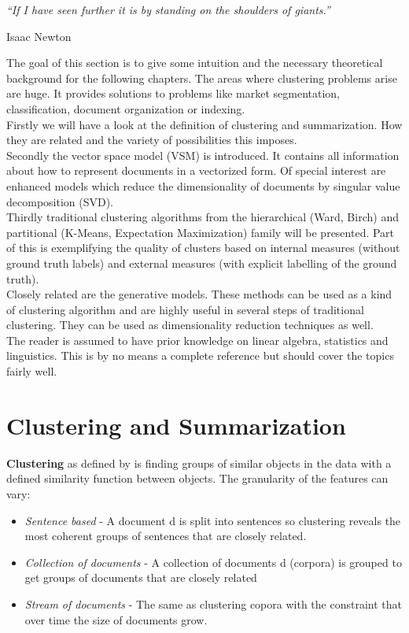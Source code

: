 \epigraph{\emph{
  ``If I have seen further it is by standing on the shoulders of giants.''
}}{ Isaac Newton }

The goal of this section is to give some intuition and the necessary theoretical background for the following chapters. The areas where clustering problems arise are huge. It provides solutions to problems like market segmentation, classification, document organization or indexing.\\
Firstly we will have a look at the definition of clustering and summarization. How they are related and the variety of possibilities this imposes.\\
Secondly the vector space model (VSM) is introduced. It contains all information about how to represent documents in a vectorized form. Of special interest are enhanced models which reduce the dimensionality of documents by singular value decomposition (SVD).\\
Thirdly traditional clustering algorithms from the hierarchical (Ward, Birch) and partitional (K-Means, Expectation Maximization) family will be presented. Part of this is exemplifying the quality of clusters based on internal measures (without ground truth labels) and external measures (with explicit labelling of the ground truth).\\
Closely related are the generative models. These methods can be used as a kind of clustering algorithm and are highly useful in several steps of traditional clustering. They can be used as dimensionality reduction techniques as well.\\
The reader is assumed to have prior knowledge on linear algebra, statistics and linguistics. This is by no means a complete reference but should cover the topics fairly well.\\


\section{Clustering and Summarization}
  
  \textbf{Clustering} as defined by \cite{ClusterAlgoSurveyIBM} is finding groups of similar objects in the data with a defined similarity function between objects. The granularity of the features can vary:

  \begin{itemize}
    \item \emph{Sentence based} - A document d is split into sentences so clustering reveals the most coherent groups of sentences that are closely related.
    \item \emph{Collection of documents} - A collection of documents d (corpora) is grouped to get groups of documents that are closely related
    \item \emph{Stream of documents} - The same as clustering copora with the constraint that over time the size of documents grow.
  \end{itemize}

